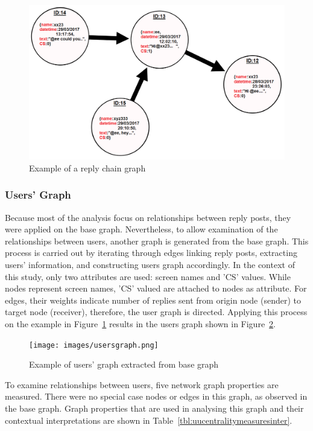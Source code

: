 \documentclass[sigconf]{acmart}
\begin{document}
\begin{figure}[htb]
\centering
\includegraphics[width=\columnwidth]{images/replychaingraph.png}
\caption{Example of a reply chain graph}
\label{fig:replychaingraph}
\end{figure}

\subsubsection{Users' Graph}

Because most of the analysis focus on relationships between reply
posts, they were applied on the base graph. Nevertheless, to allow
examination of the relationships between users, another graph is
generated from the base graph. This process is carried out by
iterating through edges linking reply posts, extracting users'
information, and constructing users graph accordingly. In the context
of this study, only two attributes are used: screen names and
'CS' values. While nodes represent screen names, 'CS' valued
are attached to nodes as attribute. For edges, their weights indicate
number of replies sent from origin node (sender) to target node
(receiver), therefore, the user graph is directed. Applying this
process on the example in Figure~\ref{fig:replychaingraph} results in
the users graph shown in Figure~\ref{fig:usersgraph}.

\begin{figure}[htb]
\centering
\texttt{[image: images/usersgraph.png]}
\caption{Example of users' graph extracted from base graph}
\label{fig:usersgraph}
\end{figure}

To examine relationships between users, five network graph properties
are measured. There were no special case nodes or edges in this graph,
as observed in the base graph. Graph properties that are used in
analysing this graph and their contextual interpretations are shown in
Table~\ref{tbl:uucentralitymeasuresinter}.
\end{document}
